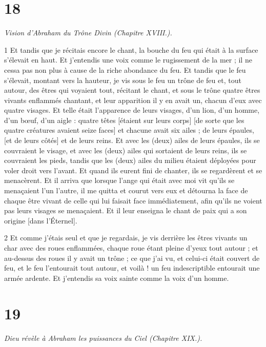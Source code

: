 \chapter{18}

\par \textit{Vision d'Abraham du Trône Divin (Chapitre XVIII.).}

\par 1 Et tandis que je récitais encore le chant, la bouche du feu qui était à la surface s'élevait en haut. Et j'entendis une voix comme le rugissement de la mer ; il ne cessa pas non plus à cause de la riche abondance du feu. Et tandis que le feu s'élevait, montant vers la hauteur, je vis sous le feu un trône de feu et, tout autour, des êtres qui voyaient tout, récitant le chant, et sous le trône quatre êtres vivants enflammés chantant, et leur apparition il y en avait un, chacun d'eux avec quatre visages. Et telle était l'apparence de leurs visages, d'un lion, d'un homme, d'un bœuf, d'un aigle : quatre têtes [étaient sur leurs corps] [de sorte que les quatre créatures avaient seize faces] et chacune avait six ailes ; de leurs épaules, [et de leurs côtés] et de leurs reins. Et avec les (deux) ailes de leurs épaules, ils se couvraient le visage, et avec les (deux) ailes qui sortaient de leurs reins, ils se couvraient les pieds, tandis que les (deux) ailes du milieu étaient déployées pour voler droit vers l'avant. Et quand ils eurent fini de chanter, ils se regardèrent et se menacèrent. Et il arriva que lorsque l'ange qui était avec moi vit qu'ils se menaçaient l'un l'autre, il me quitta et courut vers eux et détourna la face de chaque être vivant de celle qui lui faisait face immédiatement, afin qu'ils ne voient pas leurs visages se menaçaient. Et il leur enseigna le chant de paix qui a son origine [dans l'Éternel].

\par 2 Et comme j'étais seul et que je regardais, je vis derrière les êtres vivants un char avec des roues enflammées, chaque roue étant pleine d'yeux tout autour ; et au-dessus des roues il y avait un trône ; ce que j'ai vu, et celui-ci était couvert de feu, et le feu l'entourait tout autour, et voilà ! un feu indescriptible entourait une armée ardente. Et j'entendis sa voix sainte comme la voix d'un homme.

\chapter{19}

\par \textit{Dieu révèle à Abraham les puissances du Ciel (Chapitre XIX.).}

